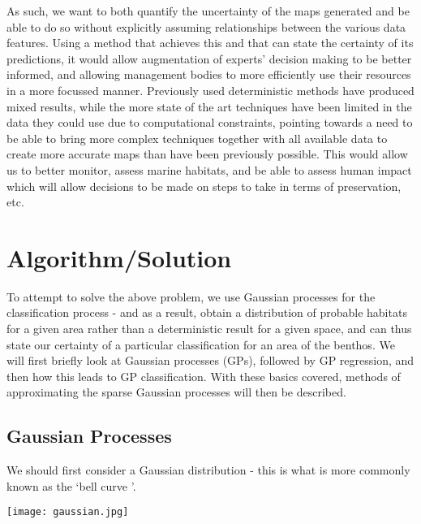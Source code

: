 \documentclass[journal]{IEEEtran}
\begin{document}
    As such, we want to both quantify the uncertainty of the maps generated and be able to do so without explicitly assuming relationships between the various data features. Using a method that achieves this and that can state the certainty of its predictions, it would allow augmentation of experts' decision making to be better informed, and allowing management bodies to more efficiently use their resources in a more focussed manner. Previously used deterministic methods have produced mixed results, while the more state of the art techniques have been limited in the data they could use due to computational constraints, pointing towards a need to be able to bring more complex techniques together with all available data to create more accurate maps than have been previously possible. This would allow us to better monitor, assess marine habitats, and be able to assess human impact which will allow decisions to be made on steps to take in terms of preservation, etc.

    \section{Algorithm/Solution}

    To attempt to solve the above problem, we use Gaussian processes for the classification process - and as a result, obtain a distribution of probable habitats for a given area rather than a deterministic result for a given space, and can thus state our certainty of a particular classification for an area of the benthos. We will first briefly look at Gaussian processes (GPs), followed by GP regression, and then how this leads to GP classification. With these basics covered, methods of approximating the sparse Gaussian processes will then be described. 

    \subsection{Gaussian Processes}

    We should first consider a Gaussian distribution - this is what is more commonly known as the \lq bell curve \rq. 

    \texttt{[image: gaussian.jpg]}
\end{document}
